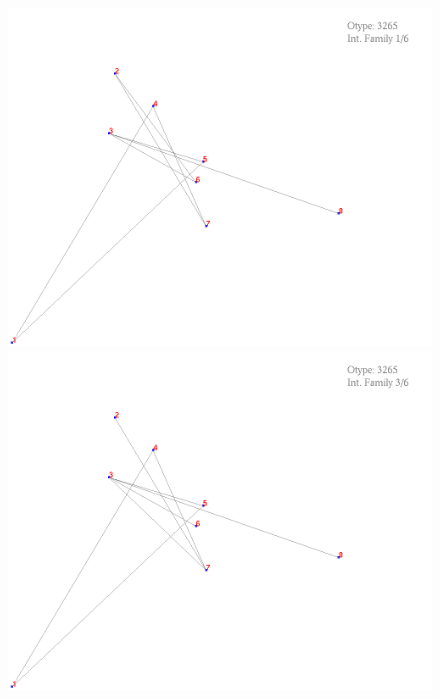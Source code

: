 \documentclass[11pt,epsf,times,letterpaper]{article}
\begin{document}
	\begin{figure}
		\includegraphics[scale=.4]{if_tam0_tam1/7.png}
		\includegraphics[scale=.4]{if_tam0_tam1/8.png}
	\end{figure}
	
\end{document}
